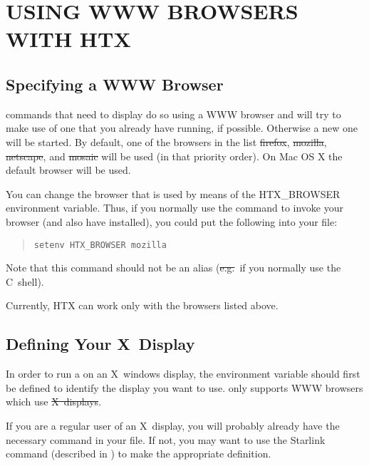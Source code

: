 \section{\label{sect:usingwwwbrowsers}USING WWW BROWSERS WITH HTX}

\subsection{\label{sect:specifyingabrowser}Specifying a WWW Browser}

 commands that need to display
 do so using a WWW browser
and will try to make use of one that you already have running, if
possible. Otherwise a new one will be started. By default, one of the
browsers in the list \st{firefox}, \st{mozilla}, \st{netscape},
and \st{mosaic} will be used (in that priority order). On Mac OS X
the default browser will be used.

You can change the browser that is used by means of the HTX\_BROWSER
environment variable. Thus, if you normally use the command  to
invoke your browser (and also have  installed), you could put the
following into your  file:

\begin{quote}
\begin{verbatim}
setenv HTX_BROWSER mozilla
\end{verbatim}
\end{quote}

Note that this command should not be an alias (\st{e.g.}\ if you
normally use the C~shell).

Currently, HTX can work only with the browsers listed above.

\subsection{Defining Your X~Display}

In order to run a  on an
X~windows display, the environment variable  should first
be defined to identify the display you want to
use.  only supports WWW browsers which use
\st{X~displays}.

If you are a regular user of an X~display, you will probably already
have the necessary command in your  file. If not, you may
want to use the Starlink  command (described in
) to make the appropriate definition.

